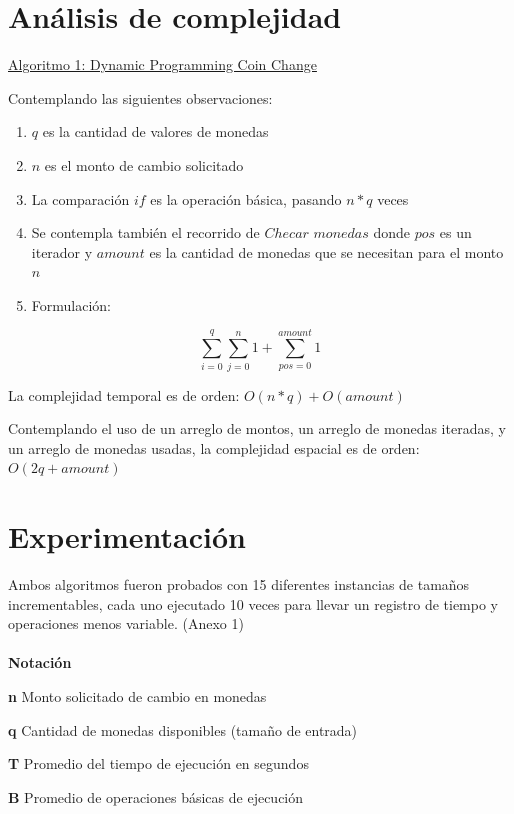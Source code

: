 \documentclass[12pt,letterpaper, titlepage, onecolumn]{article}
\begin{document}
\section{Análisis de complejidad}
\underline{Algoritmo 1: Dynamic Programming Coin Change}\\
\par Contemplando las siguientes observaciones:
\begin{enumerate}
	\item $q$ es la cantidad de valores de monedas
	\item $n$ es el monto de cambio solicitado
	\item La comparación $if$ es la operación básica, pasando $n*q$ veces
	\item Se contempla también el recorrido de $Checar$ $monedas$ donde 
	$pos$ es un iterador y $amount$ es la cantidad de monedas que se necesitan para
	el monto $n$
	\item Formulación:
\end{enumerate}

\begin{equation}
	\sum_{i=0}^{q} \sum_{j=0}^{n} 1 +\sum_{pos=0}^{amount} 1
\end{equation}

\par La complejidad temporal es de orden: $O(n*q) + O(amount)$
\par Contemplando el uso de un arreglo de montos, un arreglo de monedas iteradas, y un 
arreglo de monedas usadas, la complejidad espacial es de orden: $O(2q + amount)$\\

\section{Experimentación}
	\par Ambos algoritmos fueron probados con 15 diferentes instancias de tamaños incrementables, cada uno ejecutado 10 veces para llevar un registro de tiempo y operaciones menos variable. (Anexo 1)\\
	\\
	\textbf{Notación}
	\par\textbf{n}	\indent\indent Monto solicitado de cambio en monedas
	\par\textbf{q}	\indent\indent Cantidad de monedas disponibles  (tamaño de entrada)
	\par\textbf{T}	\indent\indent Promedio del tiempo de ejecución en segundos	
	\par\textbf{B}	\indent\indent Promedio de operaciones básicas de ejecución\\
\end{document}
